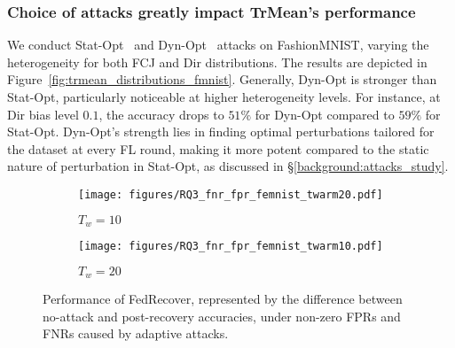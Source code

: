 \subsubsection{Choice of attacks greatly impact TrMean's performance}\label{impact:attacks:trmean}
We conduct Stat-Opt~\cite{fang2020local} and Dyn-Opt~\cite{shejwalkar2021manipulating} attacks on FashionMNIST, varying the heterogeneity for both FCJ and Dir distributions. The results are depicted in Figure~\ref{fig:trmean_distributions_fmnist}.
Generally, Dyn-Opt is stronger than Stat-Opt, particularly noticeable at higher heterogeneity levels. For instance, at Dir bias level $0.1$, the accuracy drops to $51\%$ for Dyn-Opt compared to $59\%$ for Stat-Opt. Dyn-Opt's strength lies in finding optimal perturbations tailored for the dataset at every FL round, making it more potent compared to the static nature of perturbation in Stat-Opt, as discussed in \S\ref{background:attacks_study}.
\begin{figure}[t]
    \centering
    \begin{subfigure}[b]{0.44\columnwidth}
        \texttt{[image: figures/RQ3\_fnr\_fpr\_femnist\_twarm20.pdf]}
        \caption{$T_w=10$}
        \label{fig:fedrec_fnr_fpr_twarm20}
    \end{subfigure}
    \hspace{0.5mm}
    \begin{subfigure}[b]{0.44\columnwidth}
        \texttt{[image: figures/RQ3\_fnr\_fpr\_femnist\_twarm10.pdf]}
        \caption{$T_w=20$}
        \label{fig:fedrec_fnr_fpr_twarm10}
    \end{subfigure}
    \caption{Performance of FedRecover, represented by the difference between no-attack and post-recovery accuracies, under non-zero FPRs and FNRs caused by adaptive attacks.}
    \label{fig:fedrec_fnr_fpr}
\end{figure}

